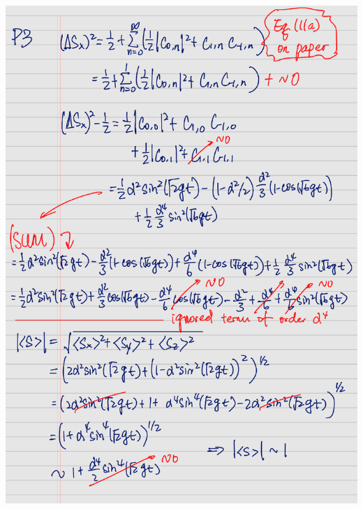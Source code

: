 \documentclass[11pt, oneside]{book}
\theoremstyle{break}
\theoremstyle{break}
\begin{document}
\begin{center}
\includegraphics[scale=0.69, page=1]{542HW7_sketch}

\end{center}
\end{document}
